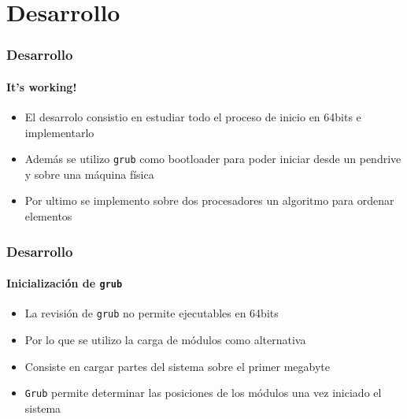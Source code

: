\documentclass{beamer}
\begin{document}
\section{Desarrollo}
  
\begin{frame}
  \frametitle{Desarrollo}
  \framesubtitle{It's working!}
  \begin{itemize}
    \setlength{\itemsep}{20pt}
    \item El desarrolo consistio en estudiar todo el proceso de inicio en 64bits e implementarlo
    \item Además se utilizo \texttt{grub} como bootloader para poder iniciar desde un pendrive y sobre una máquina física
    \item Por ultimo se implemento sobre dos procesadores un algoritmo para ordenar elementos
  \end{itemize}
\end{frame}

\begin{frame}
  \frametitle{Desarrollo}
  \framesubtitle{Inicialización de \texttt{grub}}
  \begin{itemize}
    \setlength{\itemsep}{20pt}
   \item La revisión de \texttt{grub} no permite ejecutables en 64bits
   \item Por lo que se utilizo la carga de módulos como alternativa
   \item Consiste en cargar partes del sistema sobre el primer megabyte
   \item \texttt{Grub} permite determinar las posiciones de los módulos una vez iniciado el sistema
  \end{itemize}
\end{frame}
\end{document}
